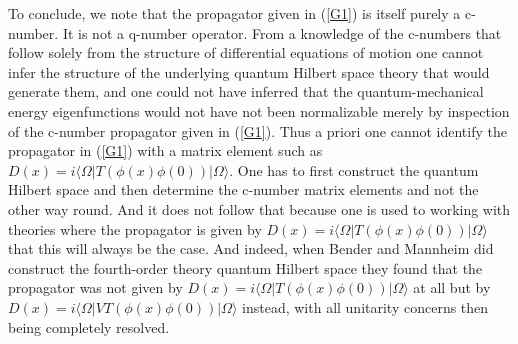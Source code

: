 \documentclass[aps]{revtex4}
\begin{document}
To conclude, we note that the propagator given in (\ref{G1}) is itself purely a  c-number. It is not a q-number operator. From a knowledge of the c-numbers that follow solely from the structure of differential equations of motion  one cannot infer the structure of the underlying quantum Hilbert space theory that would generate them, and one could not have inferred that the quantum-mechanical energy eigenfunctions would not have not been normalizable merely by inspection of the c-number propagator given in (\ref{G1}). Thus a priori one cannot identify the propagator in (\ref{G1}) with a matrix element such as $D(x)=i\langle \Omega|T(\phi(x)\phi(0))|\Omega\rangle$. One has to first construct the quantum Hilbert space and then determine the c-number matrix elements and not the other way round. And it does not follow that because one is used to working with theories where the propagator is given by  $D(x)=i\langle \Omega|T(\phi(x)\phi(0))|\Omega\rangle$ that this will always be the case. And indeed, when Bender and Mannheim did construct the fourth-order theory quantum Hilbert space they found that the propagator was not given by $D(x)=i\langle \Omega|T(\phi(x)\phi(0))|\Omega\rangle$ at all but by $D(x)=i\langle \Omega|VT(\phi(x)\phi(0))|\Omega\rangle$ instead, with all unitarity concerns then being completely resolved. 
\end{document}
